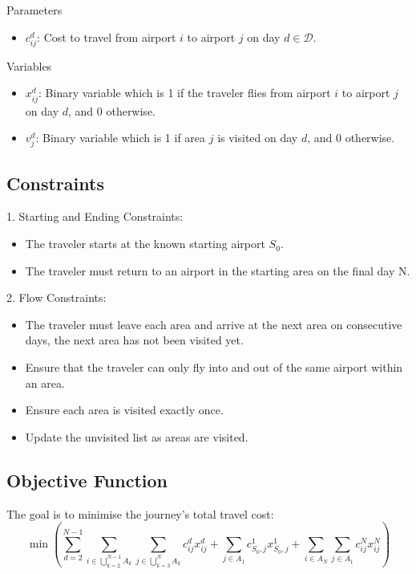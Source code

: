 Parameters
\begin{itemize}
    \item $c_{ij}^d$: Cost to travel from airport $i$ to airport $j$ on day $d \in \mathcal{D}$.
\end{itemize}

Variables
\begin{itemize}
    \item $x_{ij}^d$: Binary variable which is 1 if the traveler flies from airport $i$ to airport $j$ on day $d$, and 0 otherwise.
    \item $v_j^d$: Binary variable which is 1 if area $j$ is visited on day $d$, and 0 otherwise.
\end{itemize}

\subsection*{Constraints}
1. Starting and Ending Constraints:
\begin{itemize}
    \item The traveler starts at the known starting airport $S_{0}$.
    \item The traveler must return to an airport in the starting area on the final day N.
\end{itemize}

2. Flow Constraints:
\begin{itemize}
    \item The traveler must leave each area and arrive at the next area on consecutive days, the next area has not been visited yet.
    \item Ensure that the traveler can only fly into and out of the same airport within an area.
    \item Ensure each area is visited exactly once.
    \item Update the unvisited list as areas are visited.
\end{itemize}

\subsection*{Objective Function}
The goal is to minimise the journey's total travel cost:
\[\min \left( \sum_{d=2}^{N-1} \sum_{i \in \bigcup\limits_{k=2}^{N-1} A_k} \sum_{j \in \bigcup\limits_{k=3}^{N} A_k} c_{ij}^d x_{ij}^d + \sum_{j \in A_1} c_{S_0,j}^1 x_{S_0,j}^1 + \sum_{i \in A_N} \sum_{j \in A_1} c_{ij}^N x_{ij}^N \right)\]

